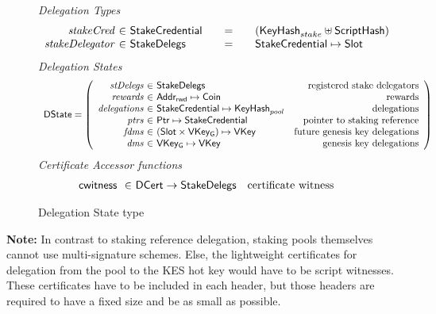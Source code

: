 \documentclass[11pt,a4paper,dvipsnames]{article}
\newcommand{\Coin}{\type{Coin}}
\newcommand{\Slot}{\type{Slot}}
\newcommand{\StakeDelegs}{\type{StakeDelegs}}
\newcommand{\StakeObject}{\type{StakeCredential}}
\newcommand{\DCert}{\type{DCert}}
\newcommand{\AddrRWD}{\type{Addr_{rwd}}}
\newcommand{\HashScr}{\type{ScriptHash}}
\newcommand{\Ptr}{\type{Ptr}}
\newcommand{\DState}{\type{DState}}
\newcommand{\VKey}{\type{VKey}}
\newcommand{\VKeyGen}{\type{VKey_G}}
\newcommand{\KeyHash}{\type{KeyHash}}
\newcommand{\cwitness}[1]{\fun{cwitness}~ \var{#1}}
\theoremstyle{definition}
\begin{document}
\begin{figure}
  \emph{Delegation Types}
    \begin{equation*}
      \begin{array}{r@{~\in~}l@{\qquad=\qquad}lr}
        \var{stakeCred} & \StakeObject & (\KeyHash_{stake} \uniondistinct
                                            \HashScr) \\
        \var{stakeDelegator} & \StakeDelegs & \StakeObject \mapsto \Slot \\
      \end{array}
    \end{equation*}
  \emph{Delegation States}
  \begin{equation*}
    \begin{array}{l}
    \DState =
    \left(\begin{array}{r@{~\in~}lr}
      \var{stDelegs} & \StakeDelegs & \text{registered stake delegators}\\
      \var{rewards} & \AddrRWD \mapsto \Coin & \text{rewards}\\
      \var{delegations} & \StakeObject \mapsto \KeyHash_{pool} & \text{delegations}\\
      \var{ptrs} & \Ptr \mapsto \StakeObject & \text{pointer to staking reference}\\
      \var{fdms} & (\Slot\times\VKeyGen) \mapsto \VKey & \text{future genesis key delegations}\\
      \var{dms} & \VKeyGen \mapsto \VKey & \text{genesis key delegations}\\
          \end{array}\right)
    \end{array}
  \end{equation*}
  \emph{Certificate Accessor functions}
  \begin{equation*}
  \begin{array}{r@{~\in~}lr}
    \cwitness{} & \DCert \to \StakeDelegs & \text{certificate witness}
  \end{array}
  \end{equation*}
  \caption{Delegation State type}
  \label{fig:delegation-state-type}
\end{figure}

\textbf{Note:} In contrast to staking reference delegation, staking pools
themselves cannot use multi-signature schemes. Else, the lightweight
certificates for delegation from the pool to the KES hot key would have to be
script witnesses. These certificates have to be included in each header, but
those headers are required to have a fixed size and be as small as possible.
\end{document}
